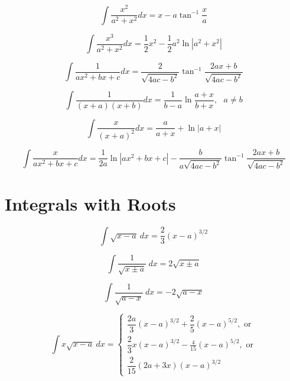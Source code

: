 \documentclass[12pt,a4paper,leqno]{article}
\begin{document}
    \begin{equation}
    \int \frac{x^2}{a^2+x^2}dx = x-a\tan^{-1}\frac{x}{a}
    \end{equation}

    \begin{equation}
    \int \frac{x^3}{a^2+x^2}dx = \frac{1}{2}x^2-\frac{1}{2}a^2\ln|a^2+x^2|
    \end{equation}

    \begin{equation}
    \int \frac{1}{ax^2+bx+c}dx = \frac{2}{\sqrt{4ac-b^2}}\tan^{-1}\frac{2ax+b}{\sqrt{4ac-b^2}}
    \end{equation}

    \begin{equation}
    \int \frac{1}{(x+a)(x+b)}dx = \frac{1}{b-a}\ln\frac{a+x}{b+x}, \text{ } a\ne b
    \end{equation}

    \begin{equation}
    \int \frac{x}{(x+a)^2}dx = \frac{a}{a+x}+\ln |a+x|
    \end{equation}


    \begin{equation}
    \int \frac{x}{ax^2+bx+c}dx = \frac{1}{2a}\ln|ax^2+bx+c|
    -\frac{b}{a\sqrt{4ac-b^2}}\tan^{-1}\frac{2ax+b}{\sqrt{4ac-b^2}}
    \end{equation}

    \section*{Integrals with Roots}


    \begin{equation}
    \int \sqrt{x-a}\ dx = \frac{2}{3}(x-a)^{3/2}
    \end{equation}



    \begin{equation}
    \int \frac{1}{\sqrt{x\pm a}}\ dx = 2\sqrt{x\pm a}
    \end{equation}

    \begin{equation}\label{eq:Rigo}
    \int \frac{1}{\sqrt{a-x}}\ dx = -2\sqrt{a-x}
    \end{equation}


    \begin{equation}\label{eq:Gilmore}
    \int x\sqrt{x-a}\ dx =
    \left\{
    \begin{array}{l}
      \dfrac{2 a}{3} \left({x-a}\right)^{3/2} +\dfrac{2 }{5}\left( {x-a}\right)^{5/2},\text{ or} \\
      \dfrac{2}{3} x(x-a)^{3/2} - \frac{4}{15} (x-a)^{5/2}, \text{ or} \\
      \dfrac{2}{15}(2a+3x)(x-a)^{3/2}
    \end{array}
    \right.
    \end{equation}
\end{document}
